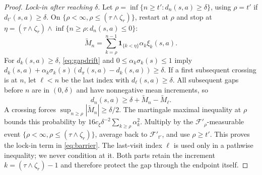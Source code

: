 \begin{proof}
\emph{Lock-in after reaching $\delta$.} Let $\rho=\inf\{n\ge t':d_n(s,a)\ge\delta\}$, using $\rho=t'$ if $d_{t'}(s,a)\ge\delta$. On $\{\rho<\infty,\rho\le(\tau\wedge\zeta_r)\}$,
restart at $\rho$ and stop at $\eta=(\tau\wedge\zeta_r)\wedge\inf\{n\ge\rho:d_n(s,a)\le0\}$:
\[
\widetilde M_n=\sum_{k=\rho}^{n-1}\mathbf1_{\{k<\eta\}}\alpha_k\xi_k(s,a).
\]
For $d_k(s,a)\ge\delta$, \eqref{eq:gapdrift} and $0\le\alpha_k\sigma_k(s)\le1$ imply $d_k(s,a)+\alpha_k\sigma_k(s)(d_\pi(s,a)-d_k(s,a))\ge\delta$. If a first subsequent crossing is
at $n$, let $\ell<n$ be the last index with $d_\ell(s,a)\ge\delta$. All subsequent gaps before $n$ are in $(0,\delta)$ and
have nonnegative mean increments, so
\[
d_n(s,a)\ge\delta+\widetilde M_n-\widetilde M_\ell.
\]
A crossing forces $\sup_{n\ge\rho}|\widetilde M_n|\ge\delta/2$. The martingale maximal inequality at $\rho$ bounds this probability by
$16c_\xi\delta^{-2}\sum_{k\ge\rho}\alpha_k^2$. Multiply by the $\mathcal F'_\rho$-measurable event $\{\rho<\infty,\rho\le(\tau\wedge\zeta_r)\}$, average back to $\mathcal F'_{t'}$,
and use $\rho\ge t'$. This proves the lock-in term in \eqref{eq:barrier}. The last-visit index $\ell$ is used only in a pathwise
inequality; we never condition at it. Both parts retain the increment $k=(\tau\wedge\zeta_r)-1$ and therefore
protect the gap through the endpoint itself.
\end{proof}

